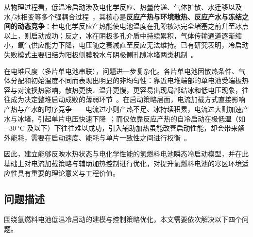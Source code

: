 \documentclass{gmcmthesis}
\begin{document}
从物理过程看，低温冷启动涉及电化学反应、热量传递、气体扩散、水迁移以及水/冰相变等多个强耦合过程~\cite{jiao2009multiphase}，其核心是\textbf{反应产热与环境散热、反应产水与冻结之间的动态竞争}：若电化学反应产热能使电池温度在孔隙被冰完全堵塞之前升至冰点以上，则启动成功；反之，冰在阴极多孔介质中持续累积，气体传输通道逐渐缩小，氧气供应能力下降，电压随之衰减直至反应无法维持。已有研究表明，冷启动失败模式主要归结为阳极侧膜脱水与阴极侧孔隙冰堵两类机制~\cite{yao2020failure}。

在电堆尺度（多片单电池串联），问题进一步复杂化。各片单电池因散热条件、气体分配和初始温度不同而表现出明显的非均匀性：靠近电堆端部的单电池受端板热容与对流换热影响，散热更快、温升更慢，更容易出现局部结冰和低电压现象，往往成为决定整堆启动成败的薄弱环节~\cite{ma2026endplate}。在启动策略层面，电流加载方式直接影响产热与产水的时序竞争——电流过小则产热不足、冰持续积累，电流过大则加速产水与冰堵，引起单片电压快速下降~\cite{jiang2010ramping}；而仅依靠反应产热的自冷启动在极低温（如 $-30~^{\circ}\mathrm{C}$ 及以下）下往往难以成功，引入辅助加热虽能改善启动性能，却会带来额外能耗，需要在启动速度、能耗与单片一致性之间进行权衡~\cite{amamou2016review,song2025adaptive}。

因此，建立能够反映水热状态与电化学性能的氢燃料电池瞬态冷启动模型，并在此基础上对电流加载策略与辅助加热控制进行优化，对提升氢燃料电池的寒区环境适应性具有重要的理论意义与工程价值。

\subsection{问题描述}
围绕氢燃料电池低温冷启动的建模与控制策略优化，本文需要依次解决以下四个问题。
\end{document}
